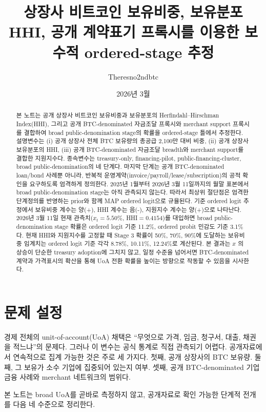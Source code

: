 \documentclass[11pt,a4paper]{article}
\title{\vspace{-1.0em}\textbf{상장사 비트코인 보유비중, 보유분포 HHI, 공개 계약표기 프록시를 이용한 보수적 ordered-stage 추정}}
\author{Theresno2ndbtc}
\date{2026년 3월}
\begin{document}
\maketitle
\vspace{-1.4em}

\begin{abstract}
본 노트는 공개 상장사 비트코인 보유비중과 보유분포의 Herfindahl--Hirschman Index(HHI), 그리고 공개 BTC-denominated 자금조달 프록시와 merchant support 프록시를 결합하여 broad public-denomination stage의 확률을 ordered-stage 틀에서 추정한다. 설명변수는 (i) 공개 상장사 전체 BTC 보유량의 총공급 2,100만 대비 비중, (ii) 공개 상장사 보유분포의 HHI, (iii) 공개 BTC-denominated 자금조달 breadth와 merchant support를 결합한 지원지수다. 종속변수는 treasury-only, financing-pilot, public-financing-cluster, broad public-denomination의 네 단계다. 마지막 단계는 공개 BTC-denominated loan/bond 사례뿐 아니라, 반복적 운영계약(invoice/payroll/lease/subscription)의 공적 확인을 요구하도록 엄격하게 정의한다. 2025년 1월부터 2026년 3월 11일까지의 월말 표본에서 broad public-denomination stage는 아직 관측되지 않는다. 따라서 최상위 절단점은 엄격한 단계정의를 반영하는 prior와 함께 MAP ordered logit으로 규율된다. 기준 ordered logit 추정에서 보유비중 계수는 양(+), HHI 계수는 음(-), 지원지수 계수는 양(+)으로 나타난다. 2026년 3월 11일 현재 관측치($x_t=5.50\%$, HHI$=0.4154$)를 대입하면 broad public-denomination stage 확률은 ordered logit 기준 11.2\%, ordered probit 민감도 기준 3.1\%다. 현재 HHI와 지원지수를 고정할 때 Stage 3 확률이 50\%, 70\%, 90\%에 도달하는 보유비중 임계치는 ordered logit 기준 각각 8.78\%, 10.11\%, 12.24\%로 계산된다. 본 결과는 $x$ 의 상승이 단순한 treasury adoption에 그치지 않고, 일정 수준을 넘어서면 BTC-denominated 계약과 가격표시의 확산을 통해 UoA 전환 확률을 높이는 방향으로 작동할 수 있음을 시사한다.
\end{abstract}

\section{문제 설정}

경제 전체의 unit-of-account(UoA) 채택은 ``무엇으로 가격, 임금, 청구서, 대출, 채권을 적느냐''의 문제다. 그러나 이 변수는 공식 통계로 직접 관측되기 어렵다. 공개자료에서 연속적으로 집계 가능한 것은 주로 세 가지다. 첫째, 공개 상장사의 BTC 보유량. 둘째, 그 보유가 소수 기업에 집중되어 있는지 여부. 셋째, 공개 BTC-denominated 기업금융 사례와 merchant 네트워크의 범위다.

본 노트는 broad UoA를 곧바로 측정하지 않고, 공개자료로 확인 가능한 단계적 전개를 다음 네 수준으로 정리한다.
\end{document}
